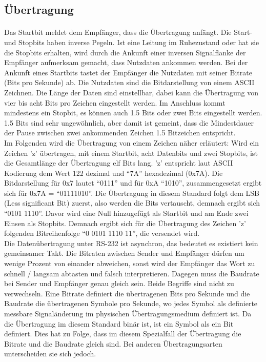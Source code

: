 \subsection{Übertragung}
\paragraph{}
Das Startbit meldet dem Empfänger, dass die Übertragung anfängt. Die Start- und Stopbits haben inverse Pegeln. Ist eine Leitung im Ruhezustand oder hat sie die Stopbits erhalten, wird durch die Ankunft einer inversen Signalflanke der Empfänger aufmerksam gemacht, dass Nutzdaten ankommen werden. Bei der Ankunft eines Startbits tastet der Empfänger die Nutzdaten mit seiner Bitrate (Bits pro Sekunde) ab. Die Nutzdaten sind die Bitdarstellung von einem ASCII Zeichnen. Die Länge der Daten sind einstellbar, dabei kann die Übertragung von vier bis acht Bits pro Zeichen eingestellt werden. Im Anschluss kommt mindestens ein Stopbit, es können auch 1.5 Bits oder zwei Bits eingestellt werden. 1.5 Bits sind sehr ungewöhnlich, aber damit ist gemeint, dass die Mindestdauer der Pause zwischen zwei ankommenden Zeichen 1.5 Bitzeichen entspricht.\\

Im Folgenden wird die Übertragung von einem Zeichen näher erläutert:
Wird ein Zeichen 'z' übertragen, mit einem Startbit, acht Datenbits und zwei Stopbits, ist die Gesamtlänge der Übertragung elf Bits lang. 'z' entspricht laut ASCII Kodierung dem Wert 122 dezimal und "`7A"' hexadezimal (0x7A). Die Bitdarstellung für 0x7 lautet "`0111"' und für 0xA "`1010"', zusammengesetzt ergibt sich für 0x7A = "`01111010"'. Die Übertragung in diesem Standard folgt dem LSB (Less significant Bit) zuerst, also werden die Bits vertauscht, demnach ergibt sich "`0101 1110"'. Davor wird eine Null hinzugefügt als Startbit und am Ende zwei Einsen als Stopbits. Demnach ergibt sich für die Übertragung des Zeichen 'z' folgenden Bitreihenfolge "`0 0101 1110 11"', die versendet wird.\\

Die Datenübertragung unter RS-232 ist asynchron, das bedeutet es existiert kein gemeinsamer Takt. Die Bitraten zwischen Sender und Empfänger dürfen um wenige Prozent von einander abweichen, sonst wird der Empfänger das Wort zu schnell / langsam abtasten und falsch interpretieren. Dagegen muss die Baudrate bei Sender und Empfänger genau gleich sein. Beide Begriffe sind nicht zu verwechseln. Eine Bitrate definiert die übertragenen Bits pro Sekunde und die Baudrate die übertragenen Symbole pro Sekunde, wo jedes Symbol als definierte messbare Signaländerung im physischen Übertragungsmedium definiert ist. Da die Übertragung im diesem Standard binär ist, ist ein Symbol als ein Bit definiert. Dies hat zu Folge, dass im diesem Spezialfall der Übertragung die Bitrate und die Baudrate gleich sind. Bei anderen Übertragungsarten unterscheiden sie sich jedoch.\\

